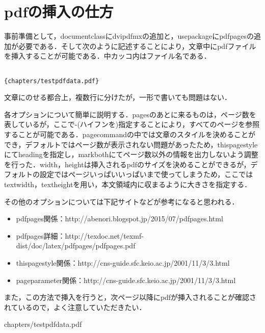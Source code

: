 \chapter{pdfの挿入の仕方}
事前準備として，documentclassにdvipdfmxの追加と，usepackageにpdfpagesの追加が必要である．そして次のように記述することにより，文章中にpdfファイルを挿入することが可能である．中カッコ内はファイル名である．

\begin{verbatim}

{chapters/testpdfdata.pdf}
\end{verbatim}

文章にのせる都合上，複数行に分けたが，一形で書いても問題はない．


各オプションについて簡単に説明する．pagesのあとに来るものは，ページ数を表しているが，ここで-(ハイフンを)指定することにより，すべてのページを参照することが可能である．pagecommandの中では文章のスタイルを決めることができ，デフォルトではページ数が表示されない問題があったため，thispagestyleにてheadingを指定し，markbothにてページ数以外の情報を出力しないよう調整を行った．width，heightは挿入されるpdfのサイズを決めることができるが，デフォルトの設定ではページいっぱいいっぱいまで使ってしまうため，ここではtextwidth，textheightを用い，本文領域内に収まるように大きさを指定する．

その他のオプションについては下記サイトなどが参考になると思われる．

\begin{itemize}
\item pdfpages関係：http://abenori.blogspot.jp/2015/07/pdfpages.html
\item pdfpages詳細：http://texdoc.net/texmf-dist/doc/latex/pdfpages/pdfpages.pdf
\item thispagestyle関係：http://cns-guide.sfc.keio.ac.jp/2001/11/3/3.html
\item pageparameter関係：http://cns-guide.sfc.keio.ac.jp/2001/11/3/3.html
\end{itemize}

また，この方法で挿入を行うと，次ページ以降にpdfが挿入されることが確認されているので，よく注意していただきたい．


{chapters/testpdfdata.pdf}
